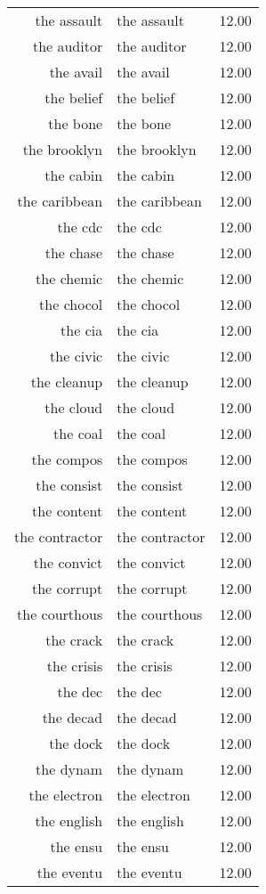 \begin{table}[ht]
\begin{tabular}{rlr}
  the assault & the assault & 12.00 \\ 
  the auditor & the auditor & 12.00 \\ 
  the avail & the avail & 12.00 \\ 
  the belief & the belief & 12.00 \\ 
  the bone & the bone & 12.00 \\ 
  the brooklyn & the brooklyn & 12.00 \\ 
  the cabin & the cabin & 12.00 \\ 
  the caribbean & the caribbean & 12.00 \\ 
  the cdc & the cdc & 12.00 \\ 
  the chase & the chase & 12.00 \\ 
  the chemic & the chemic & 12.00 \\ 
  the chocol & the chocol & 12.00 \\ 
  the cia & the cia & 12.00 \\ 
  the civic & the civic & 12.00 \\ 
  the cleanup & the cleanup & 12.00 \\ 
  the cloud & the cloud & 12.00 \\ 
  the coal & the coal & 12.00 \\ 
  the compos & the compos & 12.00 \\ 
  the consist & the consist & 12.00 \\ 
  the content & the content & 12.00 \\ 
  the contractor & the contractor & 12.00 \\ 
  the convict & the convict & 12.00 \\ 
  the corrupt & the corrupt & 12.00 \\ 
  the courthous & the courthous & 12.00 \\ 
  the crack & the crack & 12.00 \\ 
  the crisis & the crisis & 12.00 \\ 
  the dec & the dec & 12.00 \\ 
  the decad & the decad & 12.00 \\ 
  the dock & the dock & 12.00 \\ 
  the dynam & the dynam & 12.00 \\ 
  the electron & the electron & 12.00 \\ 
  the english & the english & 12.00 \\ 
  the ensu & the ensu & 12.00 \\ 
  the eventu & the eventu & 12.00 \\ 

\end{tabular}
\end{table}
